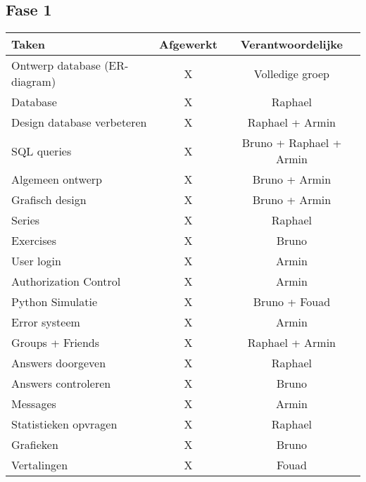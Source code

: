 \subsection{Fase 1}
\begin{tabular}{| l | c | c |}
    \hline
    Taken   &   Afgewerkt   &   Verantwoordelijke \\
    \hline \hline
    Ontwerp database (ER-diagram)   &   X   &   Volledige groep \\
    Database                &   X   &   Raphael \\
    Design database verbeteren  &   X   &   Raphael + Armin \\
    SQL queries             &   X   &   Bruno + Raphael + Armin \\
    Algemeen ontwerp        &   X   &   Bruno + Armin   \\
    Grafisch design         &   X   &   Bruno + Armin  \\
    Series                  &   X   &   Raphael \\
    Exercises               &   X   &   Bruno   \\
    User login              &   X   &   Armin   \\
    Authorization Control   &   X   &   Armin   \\
    Python Simulatie        &   X   &   Bruno + Fouad   \\
    Error systeem           &   X   &   Armin \\
    Groups + Friends        &   X   &   Raphael + Armin    \\
    Answers doorgeven       &   X   &   Raphael \\
    Answers controleren     &   X   &   Bruno   \\
    Messages                &   X   &   Armin   \\
    Statistieken opvragen   &   X   &   Raphael \\
    Grafieken               &   X   &   Bruno   \\
    Vertalingen             &   X   &   Fouad   \\
    \hline
\end{tabular}

